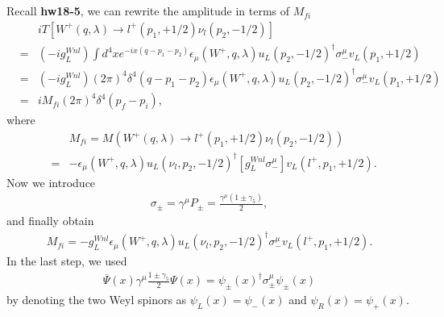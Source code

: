 \documentclass[11pt]{article}
\def\dgr{\dagger}
\def\eps{\epsilon}
\def\lmd{\lambda}
\begin{document}
\section{ }
Recall {\bf hw18-5}, we can rewrite the amplitude in terms of $M_{fi}$
\begin{eqnarray}
    && iT[W^+(q,\lmd) \to l^+(p_1,+1/2) \nu_l(p_2,-1/2)] \nonumber \\
   &=& (-ig_L^{Wnl}) \int d^4x e^{-ix(q-p_1-p_2)}
   \eps_\mu(W^+,q,\lmd) u_L(p_2,-1/2)^\dgr \sigma_-^\mu v_L(p_1,+1/2)\\
   &=& (-ig_L^{Wnl}) (2\pi)^4 \delta^4(q-p_1-p_2)
   \eps_\mu(W^+,q,\lmd) u_L(p_2,-1/2)^\dgr \sigma_-^\mu v_L(p_1,+1/2) \\
   &=& i M_{fi} (2\pi)^4 \delta^4(p_f-p_i),
\end{eqnarray}
where
\begin{eqnarray}
    &&   M_{fi}
    = M(W^+(q,\lmd) \to l^+(p_1,+1/2) \nu_l(p_2,-1/2))\\
    &=& -\eps_\mu(W^+,q,\lmd)
    u_L(\nu_l,p_2,-1/2)^\dgr [ g_L^{Wnl} \sigma_-^\mu ] v_L(l^+,p_1,+1/2).
\end{eqnarray}
Now we introduce
\begin{eqnarray}
    \sigma_\pm
=    \gamma^\mu P_\pm
=    \frac{\gamma^\mu (1 \pm \gamma_5)}{2},
\end{eqnarray}
and finally obtain
\begin{eqnarray}
M_{fi}= -g_L^{Wnl} \eps_\mu(W^+,q,\lmd)
   u_L(\nu_l,p_2,-1/2)^\dgr \sigma_-^\mu v_L(l^+,p_1,+1/2).
\end{eqnarray}
In the last step, we used
\begin{eqnarray}
    {\overline \Psi}(x) \gamma^\mu \frac{1 \pm \gamma_5}{2} \Psi(x)
=    \psi_\pm(x)^\dgr  \sigma_\pm^\mu  \psi_\pm(x) \label{eq.18_41b}
\end{eqnarray}
by denoting the two Weyl spinors as $\psi_L(x)=\psi_-(x)$ and
$\psi_R(x)=\psi_+(x)$.
\end{document}
